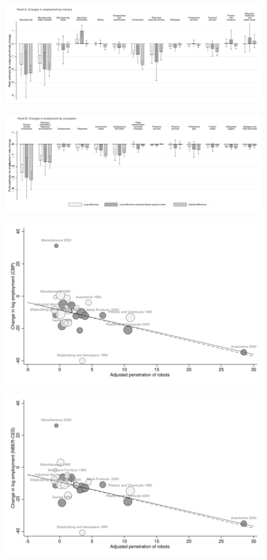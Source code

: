 \documentclass{article}
\begin{document}
\begin{center}\includegraphics[scale=0.15]{output/figure_heterogeneity_industry.png}\end{center}
\begin{center}\includegraphics[scale=0.15]{output/figure_heterogeneity_occupation.png}\end{center}
\begin{center}\includegraphics[scale=0.15]{output/figure_industry_emp_cbp.png}\end{center}
\begin{center}\includegraphics[scale=0.15]{output/figure_industry_emp_nber.png}\end{center}
\end{document}

